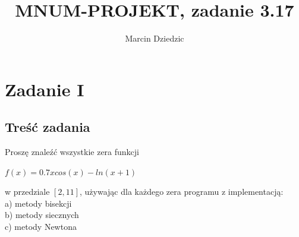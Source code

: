 \documentclass[11pt, oneside]{article}   	%
\title{MNUM-PROJEKT, zadanie 3.17}
\author{Marcin Dziedzic}
\begin{document}
\maketitle{}
\tableofcontents
\section{Zadanie I}
\subsection{Treść zadania}
Proszę znaleźć wszystkie zera funkcji
\begin{center}
$f(x) = 0.7xcos(x)-ln(x+1)$
\end{center}
w przedziale $[2,11]$, używając dla każdego zera programu z implementacją:\\
a) metody bisekcji\\
b) metody siecznych\\
c) metody Newtona\\
\end{document}
